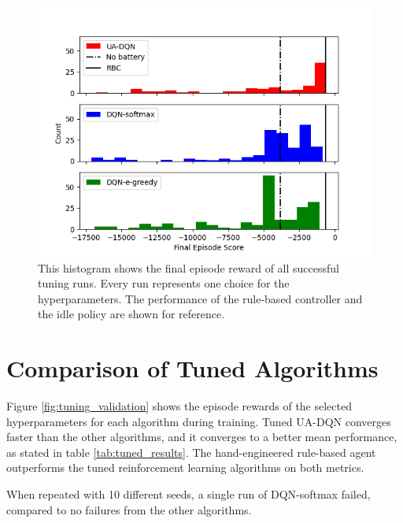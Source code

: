 \begin{figure}
  \centering
  \includegraphics[width=\figurewidth]{figures/tuning_results.png}
  \caption{This histogram shows the final episode reward of all successful tuning runs. Every run represents one choice for the hyperparameters. The performance of the rule-based controller and the idle policy are shown for reference.}
  \label{fig:tuning_results}
\end{figure}

\section{Comparison of Tuned Algorithms}
Figure \ref{fig:tuning_validation} shows the episode rewards of the selected hyperparameters for each algorithm during training.
Tuned UA-DQN converges faster than the other algorithms, and it converges to a better mean performance, as stated in table \ref{tab:tuned_results}. The hand-engineered rule-based agent outperforms the tuned reinforcement learning algorithms on both metrics.

When repeated with 10 different seeds, a single run of DQN-softmax failed, compared to no failures from the other algorithms.


